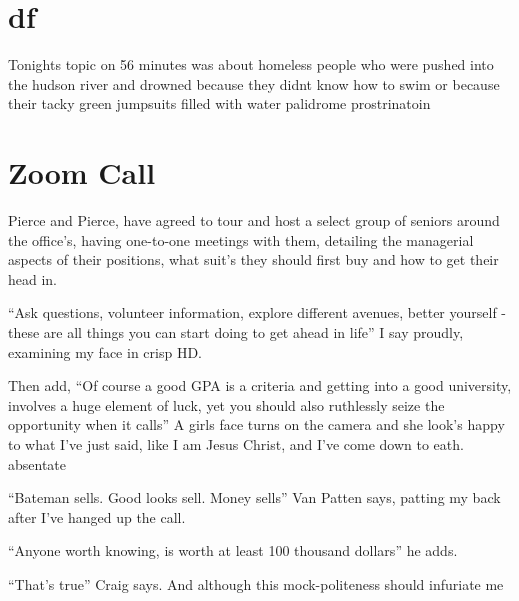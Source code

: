 \documentclass[19pt,openany]{book}
\begin{document}
\chapter{df}
Tonights topic on 56 minutes was about homeless people who were pushed into the hudson river and drowned because they didnt know how to swim or because their tacky green jumpsuits filled with water
palidrome prostrinatoin
\chapter{Zoom Call}

Pierce and Pierce, have agreed to tour and
host a select group of seniors around the office's,
having one-to-one meetings with them, detailing
the managerial aspects of their positions,
what suit's they should first buy and how
to get their head in.

``Ask questions, volunteer information, explore
different avenues, better yourself -these are all
things you can start doing to get ahead in life''
I say proudly, examining my face in crisp HD.

Then add, ``Of course a good GPA is a criteria
and getting into a good university, involves
a huge element of luck, yet you should also
ruthlessly seize the opportunity when it calls''
A girls face turns on the camera and she look's
happy to what I've just said, like I am Jesus
Christ, and I've come down to eath.
absentate

``Bateman sells. Good looks sell. Money sells'' Van Patten says, patting
my back after I've hanged up the call.

``Anyone worth knowing, is worth at least 100 thousand dollars'' he adds.

``That's true'' Craig says.
And although this mock-politeness should infuriate me
\end{document}
